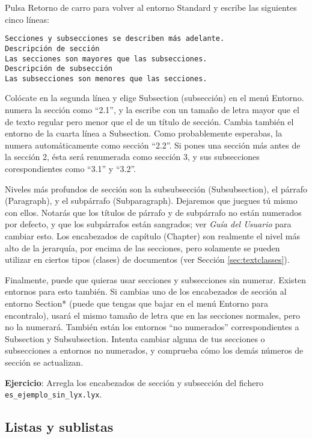 Pulsa \textsf{Retorno de carro} para volver al entorno \textsf{Standard}
y escribe las siguientes cinco líneas:

\begin{verbatim}
Secciones y subsecciones se describen más adelante.
Descripción de sección
Las secciones son mayores que las subsecciones.
Descripción de subsección
Las subsecciones son menores que las secciones.
\end{verbatim}

Colócate en la segunda línea y elige \textsf{Subsection} (subsección)
en el menú \textsf{Entorno}. \LyX{} numera la sección como {}``2.1'',
y la escribe con un tamaño de letra mayor que el de texto regular
pero menor que el de un título de sección. Cambia también el entorno
de la cuarta línea a \textsf{Subsection}. Como probablemente esperabas,
\LyX{} la numera automáticamente como sección {}``2.2''. Si pones
una sección más antes de la sección 2, ésta será renumerada como sección
3, y sus subsecciones corespondientes como {}``3.1'' y {}``3.2''.

Niveles más profundos de sección son la subsubsección (\textsf{Subsubsection}),
el párrafo (\textsf{Paragraph}), y el subpárrafo (\textsf{Subparagraph}).
Dejaremos que juegues tú mismo con ellos. Notarás que los títulos
de párrafo y de subpárrafo no están numerados por defecto, y que los
subpárrafos están sangrados; ver \emph{Guía del Usuario} para cambiar
esto. Los encabezados de capítulo (\textsf{Chapter}) son realmente
el nivel más alto de la jerarquía, por encima de las secciones, pero
solamente se pueden utilizar en ciertos tipos (clases) de documentos
(ver Sección \ref{sec:textclasses}). 

Finalmente, puede que quieras usar secciones y subsecciones sin numerar.
Existen entornos para esto también. Si cambias uno de los encabezados
de sección al entorno \textsf{Section{*}} (puede que tengas que bajar
en el menú \textsf{Entorno} para encontralo), \LyX{} usará el mismo
tamaño de letra que en las secciones normales, pero no la numerará.
También están los entornos {}``no numerados'' correspondientes a
\textsf{Subsection} y \textsf{Subsubsection}. Intenta cambiar alguna
de tus secciones o subsecciones a entornos no numerados, y comprueba
cómo los demás números de sección se actualizan.

\textbf{Ejercicio}: Arregla los encabezados de sección y subsección
del fichero \texttt{es\_ejemplo\_sin\_lyx.lyx}. 


\subsection{Listas y sublistas}

